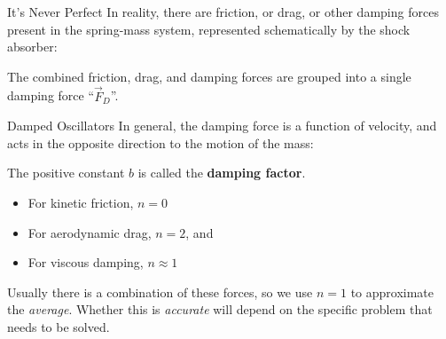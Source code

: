 \documentclass[12pt,compress,aspectratio=169]{beamer}
\begin{document}
\begin{frame}{It's Never Perfect}
  In reality, there are friction, or drag, or other damping forces present in
  the spring-mass system, represented schematically by the shock absorber:
  \begin{center}
  \end{center}
  The combined friction, drag, and damping forces are grouped into a single
  damping force ``$\vec F_D$''.
\end{frame}



\begin{frame}{Damped Oscillators}
  In general, the damping force is a function of velocity, and acts in the
  opposite direction to the motion of the mass:
  

  \vspace{-.15in}The positive constant $b$ is called the \textbf{damping
    factor}.
  \begin{itemize}
  \item For kinetic friction, $n=0$
  \item For aerodynamic drag, $n=2$, and
  \item For viscous damping, $n\approx 1$
  \end{itemize}
  Usually there is a combination of these forces, so we use $n=1$ to
  approximate the \emph{average}. Whether this is \emph{accurate} will depend
  on the specific problem that needs to be solved.
\end{frame}
\end{document}
